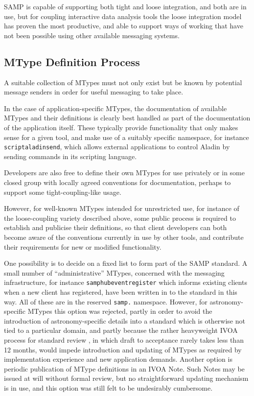 \documentclass[5p]{elsarticle}
\begin{document}
SAMP is capable of supporting both tight and loose integration,
and both are in use,
but for coupling interactive data analysis tools the loose integration
model has proven the most productive,
and able to support ways of working that have not been possible
using other available messaging systems.

\subsection{MType Definition Process} \label{sec:mtypeProcess}

A suitable collection of MTypes must not only exist but be known by
potential message senders in order for useful messaging to take place.

In the case of application-specific MTypes, the documentation of
available MTypes and their definitions is clearly
best handled as part of the documentation of the application itself.
These typically provide functionality that only makes sense for
a given tool, and make use of a suitably specific namespace,
for instance {\tt script{\kdot}aladin{\kdot}send},
which allows external applications to control Aladin
\citep{2000A&AS..143...33B} by sending commands in its scripting language.

Developers are also free to define their own MTypes for use privately
or in some closed group with locally agreed conventions for documentation,
perhaps to support some tight-coupling-like usage.

However, for well-known MTypes intended for unrestricted use,
for instance of the loose-coupling variety described above,
some public process is required to establish
and publicise their definitions, so that client developers can
both become aware of the conventions currently in use by other tools,
and contribute their requirements for new or modified functionality.

One possibility
is to decide on a fixed list to form part of the SAMP standard.
A small number of ``administrative'' MTypes,
concerned with the messaging infrastructure,
for instance {\tt samp{\kdot}hub{\kdot}event{\kdot}register}
which informs existing clients when a new client has registered,
have been written in to the standard in this way.
All of these are in the reserved {\tt samp.} namespace.
However, for astronomy-specific MTypes this option was rejected,
partly in order to avoid the introduction of astronomy-specific details
into a standard which is otherwise not tied to a particular domain,
and partly because the rather heavyweight IVOA process for
standard review \citep{ivoadoc},
in which draft to acceptance rarely takes less than 12 months,
would impede introduction and updating of MTypes as required
by implementation experience and new application demands.
Another option is periodic publication of MType definitions
in an IVOA Note.  Such Notes may be issued at will without formal review,
but no straightforward updating mechanism is in use,
and this option was still felt to be undesirably cumbersome.
\end{document}
